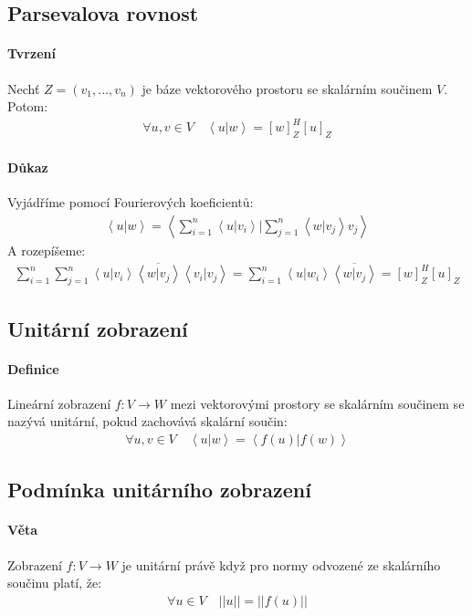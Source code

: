 \documentclass[a4paper,10pt]{article}
\begin{document}
\subsection{Parsevalova rovnost}
\setcounter{equation}{0}
\paragraph{Tvrzení}
Nechť $Z=(v_1, ..., v_n)$ je báze vektorového prostoru se skalárním součinem $V$.
Potom:
\begin{align*}
	\forall u,v \in V \quad \left<u|w\right> = [w]_Z^H[u]_Z
\end{align*}
\paragraph{Důkaz}
Vyjádříme pomocí Fourierových koeficientů:
\begin{align}
	\left<u|w\right> = \left< \sum_{i=1}^n\left<u|v_i\right> \Big| \sum_{j=1}^n \left<w|v_j\right>v_j \right>
\end{align}
A rozepíšeme:
\begin{align}
	\sum_{i=1}^n \sum_{j=1}^n
	\left<u|v_i\right>\overline{\left<w|v_j\right>}\left<v_i|v_j\right> 
	= \sum_{i=1}^n \left<u|w_i\right> \overline{\left<w|v_j\right>} =
	[w]_Z^H[u]_Z
\end{align}


\subsection{Unitární zobrazení}
\setcounter{equation}{0}
\paragraph{Definice}
Lineární zobrazení $f:V \to W$ mezi vektorovými prostory se skalárním součinem
se nazývá unitární, pokud zachovává skalární součin:
\begin{align*}
	\forall u, v \in V \quad \left<u|w\right> = \left< f(u) | f(w) \right >
\end{align*}

\subsection{Podmínka unitárního zobrazení}
\setcounter{equation}{0}
\paragraph{Věta}
Zobrazení $f: V \to W$ je unitární právě když pro normy odvozené ze skalárního
součinu platí, že:
\begin{align*}
	\forall u \in V \quad ||u|| = ||f(u)||
\end{align*}
\end{document}
